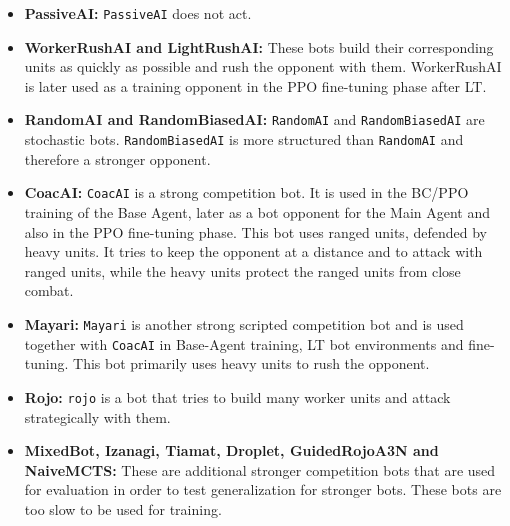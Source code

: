 \documentclass[10pt,twocolumn,letterpaper]{article}
\begin{document}
\begin{itemize}
    \item \textbf{PassiveAI:} \texttt{PassiveAI} does not act.
    \item \textbf{WorkerRushAI and LightRushAI:} These bots build their corresponding units as quickly as possible and rush the opponent with them.
    WorkerRushAI is later used as a training opponent in the PPO fine-tuning phase after LT.
    \item \textbf{RandomAI and RandomBiasedAI:} \texttt{RandomAI} and \texttt{RandomBiasedAI} are stochastic bots.
    \texttt{RandomBiasedAI} is more structured than \texttt{RandomAI} and therefore a stronger opponent.
    \item \textbf{CoacAI:} \texttt{CoacAI} is a strong competition bot. 
    It is used in the BC/PPO training of the Base Agent, later as a bot opponent for the Main Agent and also in the PPO fine-tuning phase.
    This bot uses ranged units, defended by heavy units.
    It tries to keep the opponent at a distance and to attack with ranged units, while the heavy units protect the ranged units from close combat.
    \item \textbf{Mayari:} \texttt{Mayari} is another strong scripted competition bot and is used together with \texttt{CoacAI} in Base-Agent training, LT bot environments and fine-tuning.
    This bot primarily uses heavy units to rush the opponent.
    \item \textbf{Rojo:} \texttt{rojo} is a bot that tries to build many worker units and attack strategically with them.
    \item \textbf{MixedBot, Izanagi, Tiamat, Droplet, GuidedRojoA3N and NaiveMCTS:} These are additional stronger competition bots that are used for evaluation in order to test generalization for stronger bots.
    These bots are too slow to be used for training.
\end{itemize}
\end{document}
